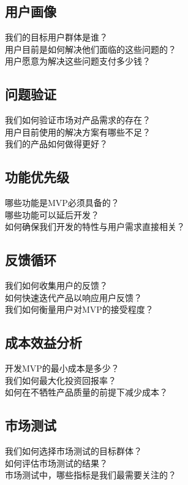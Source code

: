 \documentclass[12pt]{book}
\begin{document}
\subsection{用户画像}
我们的目标用户群体是谁？\\
用户目前是如何解决他们面临的这些问题的？\\
用户愿意为解决这些问题支付多少钱？\\

\subsection{问题验证}
我们如何验证市场对产品需求的存在？\\
用户目前使用的解决方案有哪些不足？\\
我们的产品如何做得更好？\\

\subsection{功能优先级}
哪些功能是MVP必须具备的？\\
哪些功能可以延后开发？\\
如何确保我们开发的特性与用户需求直接相关？\\

\subsection{反馈循环}
我们如何收集用户的反馈？\\
如何快速迭代产品以响应用户反馈？\\
我们如何衡量用户对MVP的接受程度？\\

\subsection{成本效益分析}
开发MVP的最小成本是多少？\\
我们如何最大化投资回报率？\\
如何在不牺牲产品质量的前提下减少成本？\\

\subsection{市场测试}
我们如何选择市场测试的目标群体？\\
如何评估市场测试的结果？\\
市场测试中，哪些指标是我们最需要关注的？\\
\end{document}
